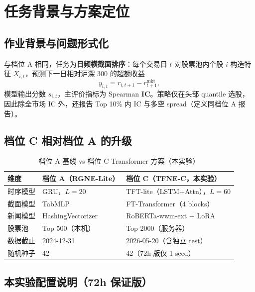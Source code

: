 \documentclass[UTF8,a4paper,12pt]{ctexart}
\begin{document}
\section{任务背景与方案定位}

\subsection{作业背景与问题形式化}

与档位 A 相同，任务为\textbf{日频横截面排序}：每个交易日 $t$ 对股票池内个股 $i$ 构造特征 $X_{i,t}$，预测下一日相对沪深 300 的超额收益
\begin{equation}
  y_{i,t} = r_{i,t+1} - r^{\mathrm{mkt}}_{t+1},
\end{equation}
模型输出分数 $s_{i,t}$，主评价指标为 Spearman \textbf{IC}。策略仅在头部 quantile 选股，因此除全市场 IC 外，还报告 Top 10\% 内 IC 与多空 spread（定义同档位 A 报告）。

\subsection{档位 C 相对档位 A 的升级}

\begin{table}[H]
\centering
\caption{档位 A 基线 vs 档位 C Transformer 方案（本实验）}
\label{tab:vs-a}
\begin{tabular}{lll}
\toprule
\textbf{维度} & \textbf{档位 A（RGNE-Lite）} & \textbf{档位 C（TFNE-C，本实验）} \\
\midrule
时序模型   & GRU，$L=20$         & TFT-lite（LSTM+Attn），$L=60$ \\
截面模型   & TabMLP              & FT-Transformer（4 blocks） \\
新闻模型   & HashingVectorizer   & RoBERTa-wwm-ext + LoRA \\
股票池     & Top 500（本机）     & Top 2000（服务器） \\
数据截止   & 2024-12-31          & 2026-05-20（含独立 test） \\
随机种子   & 42                  & 42（72h 版仅 1 seed） \\
\bottomrule
\end{tabular}
\end{table}

\subsection{本实验配置说明（72h 保证版）}
\end{document}
